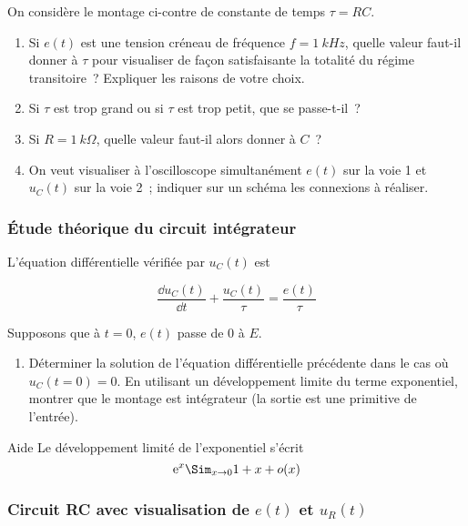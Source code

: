 \documentclass[a4paper, 11pt, final, garamond]{book}
\begin{document}
On considère le montage ci-contre de constante de temps $\tau = RC$.

\begin{enumerate}
    \item Si $e(t)$ est une tension créneau de fréquence $f = \SI{1}{kHz}$,
        quelle valeur faut-il donner à $\tau$ pour visualiser de façon
        satisfaisante la totalité du régime transitoire~? Expliquer les raisons
        de votre choix. 
    \item Si $\tau$ est trop grand ou si $\tau$ est trop petit, que se
        passe-t-il~? 
    \item Si $R = \SI{1}{k\Omega}$, quelle valeur faut-il alors donner à $C$~? 
    \item On veut visualiser à l'oscilloscope simultanément $e(t)$ sur la voie 1
        et $u_{C}(t)$ sur la voie 2~; indiquer sur un schéma les connexions à
        réaliser.
\end{enumerate}

\subsubsection{Étude théorique du circuit intégrateur}

L'équation différentielle vérifiée par $u_{C}(t)$ est

\[\frac{\dd u_{C}(t)}{\dd t} + \frac{u_{C}(t)}{\tau} = \frac{e(t)}{\tau}\]

Supposons que à $t=0$, $e(t)$ passe de $0$ à $E$.

\begin{enumerate}[resume]
    \item Déterminer la solution de l'équation différentielle précédente dans
        le cas où $u_{C}(t=0) = 0$. En utilisant un développement limite du
        terme exponentiel, montrer que le montage est intégrateur (la sortie est
        une primitive de l'entrée).
\end{enumerate}

\medskip

\begin{instruc}[tikz={rotate=180, transform shape}]{Aide}
   Le développement limité de l'exponentiel s'écrit
   \[\text{e}^x \Sim_{x \to 0} 1+x + o(x)\]
\end{instruc}

\subsubsection{Circuit RC avec visualisation de $e(t)$ et $u_{R}(t)$}
\end{document}
